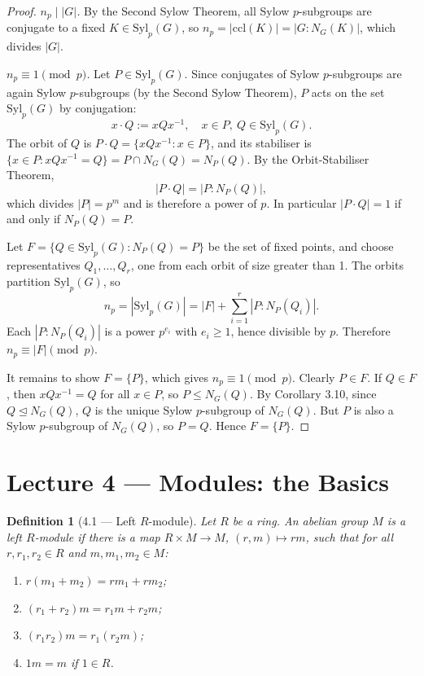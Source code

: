 \documentclass[12pt]{article}
\newtheorem{definition}{Definition}
\begin{document}
\begin{proof}
\textit{$n_p \mid |G|$.} By the Second Sylow Theorem, all Sylow $p$-subgroups are conjugate to a fixed $K \in \mathrm{Syl}_p(G)$, so $n_p = |\mathrm{ccl}(K)| = |G : N_G(K)|$, which divides $|G|$.

\textit{$n_p \equiv 1 \pmod{p}$.} Let $P \in \mathrm{Syl}_p(G)$. Since conjugates of Sylow $p$-subgroups are again Sylow $p$-subgroups (by the Second Sylow Theorem), $P$ acts on the set $\mathrm{Syl}_p(G)$ by conjugation:
\[
  x \cdot Q := xQx^{-1}, \quad x \in P,\ Q \in \mathrm{Syl}_p(G).
\]
The orbit of $Q$ is $P \cdot Q = \{xQx^{-1} : x \in P\}$, and its stabiliser is $\{x \in P : xQx^{-1} = Q\} = P \cap N_G(Q) = N_P(Q)$. By the Orbit-Stabiliser Theorem,
\[
  |P \cdot Q| = |P : N_P(Q)|,
\]
which divides $|P| = p^m$ and is therefore a power of $p$. In particular $|P \cdot Q| = 1$ if and only if $N_P(Q) = P$.

Let $F = \{Q \in \mathrm{Syl}_p(G) : N_P(Q) = P\}$ be the set of fixed points, and choose representatives $Q_1, \dots, Q_r$, one from each orbit of size greater than 1. The orbits partition $\mathrm{Syl}_p(G)$, so
\[
  n_p = |\mathrm{Syl}_p(G)| = |F| + \sum_{i=1}^{r} |P : N_P(Q_i)|.
\]
Each $|P : N_P(Q_i)|$ is a power $p^{e_i}$ with $e_i \geq 1$, hence divisible by $p$. Therefore $n_p \equiv |F| \pmod{p}$.

It remains to show $F = \{P\}$, which gives $n_p \equiv 1 \pmod{p}$. Clearly $P \in F$. If $Q \in F$, then $xQx^{-1} = Q$ for all $x \in P$, so $P \leq N_G(Q)$. By Corollary 3.10, since $Q \trianglelefteq N_G(Q)$, $Q$ is the unique Sylow $p$-subgroup of $N_G(Q)$. But $P$ is also a Sylow $p$-subgroup of $N_G(Q)$, so $P = Q$. Hence $F = \{P\}$.
\end{proof}


\section*{Lecture 4 — Modules: the Basics}

\begin{definition}[4.1 — Left $R$-module]
Let $R$ be a ring. An abelian group $M$ is a \emph{left $R$-module} if there is a map $R \times M \to M$, $(r,m) \mapsto rm$, such that for all $r, r_1, r_2 \in R$ and $m, m_1, m_2 \in M$:
\begin{enumerate}[label=(\roman*)]
  \item $r(m_1 + m_2) = rm_1 + rm_2$;
  \item $(r_1 + r_2)m = r_1 m + r_2 m$;
  \item $(r_1 r_2)m = r_1(r_2 m)$;
  \item $1m = m$ if $1 \in R$.
\end{enumerate}
\end{definition}
\end{document}
